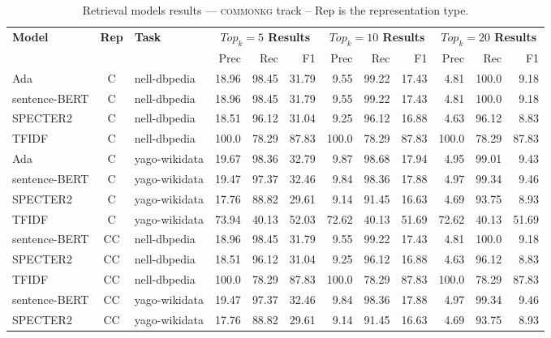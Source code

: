 
    \begin{table}[h]
         \centering
         \caption{Retrieval models results --- \textsc{commonkg} track -- Rep is the representation type.} \label{tab:ir_commonkg}
         \begin{tabular}{|l|c|l|r|r|r|r|r|r|r|r|r|}
             \hline
             \multirow{2}{*}{\textbf{Model}}  & \multirow{2}{*}{\textbf{Rep}}  & \multirow{2}{*}{\textbf{Task}} &  \multicolumn{3}{c|}{\textbf{$Top_k=5$ Results}} &  \multicolumn{3}{c|}{\textbf{$Top_k=10$ Results}} &  \multicolumn{3}{c|}{\textbf{$Top_k=20$ Results}}\\
             \cline{4-12}
              & & & Prec & Rec & F1& Prec & Rec & F1& Prec & Rec & F1 \\
             \hline
    	Ada  & C & nell-dbpedia  & 18.96 & 98.45 & 31.79 & 9.55 & 99.22 & 17.43 & 4.81 & 100.0 & 9.18\\
	sentence-BERT  & C & nell-dbpedia  & 18.96 & 98.45 & 31.79 & 9.55 & 99.22 & 17.43 & 4.81 & 100.0 & 9.18\\
	SPECTER2  & C & nell-dbpedia  & 18.51 & 96.12 & 31.04 & 9.25 & 96.12 & 16.88 & 4.63 & 96.12 & 8.83\\
	TFIDF  & C & nell-dbpedia  & 100.0 & 78.29 & 87.83 & 100.0 & 78.29 & 87.83 & 100.0 & 78.29 & 87.83\\
	\hline
	Ada  & C & yago-wikidata  & 19.67 & 98.36 & 32.79 & 9.87 & 98.68 & 17.94 & 4.95 & 99.01 & 9.43\\
	sentence-BERT  & C & yago-wikidata  & 19.47 & 97.37 & 32.46 & 9.84 & 98.36 & 17.88 & 4.97 & 99.34 & 9.46\\
	SPECTER2  & C & yago-wikidata  & 17.76 & 88.82 & 29.61 & 9.14 & 91.45 & 16.63 & 4.69 & 93.75 & 8.93\\
	TFIDF  & C & yago-wikidata  & 73.94 & 40.13 & 52.03 & 72.62 & 40.13 & 51.69 & 72.62 & 40.13 & 51.69\\
	\hline
	sentence-BERT  & CC & nell-dbpedia  & 18.96 & 98.45 & 31.79 & 9.55 & 99.22 & 17.43 & 4.81 & 100.0 & 9.18\\
	SPECTER2  & CC & nell-dbpedia  & 18.51 & 96.12 & 31.04 & 9.25 & 96.12 & 16.88 & 4.63 & 96.12 & 8.83\\
	TFIDF  & CC & nell-dbpedia  & 100.0 & 78.29 & 87.83 & 100.0 & 78.29 & 87.83 & 100.0 & 78.29 & 87.83\\
	\hline
	sentence-BERT  & CC & yago-wikidata  & 19.47 & 97.37 & 32.46 & 9.84 & 98.36 & 17.88 & 4.97 & 99.34 & 9.46\\
	SPECTER2  & CC & yago-wikidata  & 17.76 & 88.82 & 29.61 & 9.14 & 91.45 & 16.63 & 4.69 & 93.75 & 8.93\\

\end{tabular}
\end{table}
